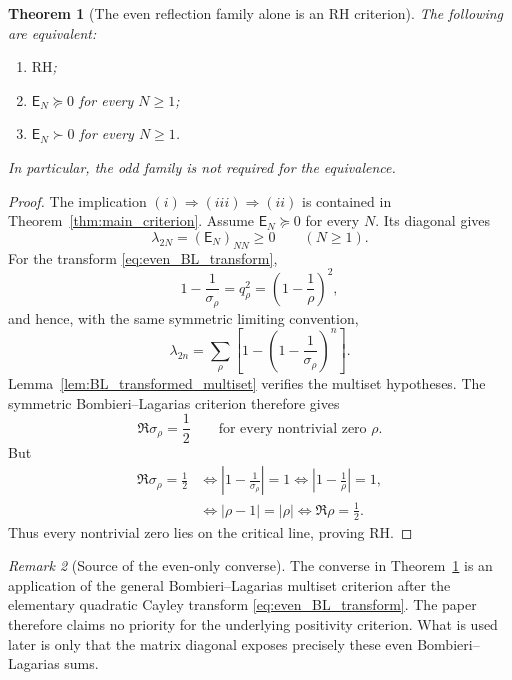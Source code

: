 \documentclass[preprint,12pt]{elsarticle}
\numberwithin{equation}{section}
\theoremstyle{plain}
\newtheorem{theorem}{Theorem}[section]
\theoremstyle{definition}
\theoremstyle{remark}
\newtheorem{remark}[theorem]{Remark}
\newcommand{\RH}{\mathrm{RH}}
\newcommand{\E}{\mathsf E}
\begin{document}
\begin{theorem}[The even reflection family alone is an RH criterion]
\label{thm:even_family_alone}
The following are equivalent:
\begin{enumerate}[label=(\roman*)]
\item \(\RH\);
\item \(\E_N\succeq0\) for every \(N\ge1\);
\item \(\E_N\succ0\) for every \(N\ge1\).
\end{enumerate}
In particular, the odd family is not required for the equivalence.
\end{theorem}

\begin{proof}
The implication \((i)\Rightarrow(iii)\Rightarrow(ii)\) is contained in
Theorem~\ref{thm:main_criterion}.  Assume \(\E_N\succeq0\) for every \(N\).  Its diagonal
gives
\[
\lambda_{2N}=(\E_N)_{NN}\ge0
\qquad(N\ge1).
\]
For the transform \eqref{eq:even_BL_transform},
\begin{equation}
1-\frac1{\sigma_\rho}
=q_\rho^2
=\left(1-\frac1\rho\right)^2,
\label{eq:even_BL_exact_identities}
\end{equation}
and hence, with the same symmetric limiting convention,
\begin{equation}
\lambda_{2n}
=\sum_\rho\left[
1-\left(1-\frac1{\sigma_\rho}\right)^n
\right].
\label{eq:even_Li_as_BL_sum}
\end{equation}
Lemma~\ref{lem:BL_transformed_multiset} verifies the multiset hypotheses.  The symmetric
Bombieri--Lagarias criterion therefore gives
\[
\Re\sigma_\rho=\frac12
\qquad\text{for every nontrivial zero }\rho.
\]
But
\[
\begin{aligned}
\Re\sigma_\rho=\frac12
&\iff \left|1-\frac1{\sigma_\rho}\right|=1
\iff \left|1-\frac1\rho\right|=1,\\
&\iff |\rho-1|=|\rho|
\iff \Re\rho=\frac12.
\end{aligned}
\]
Thus every nontrivial zero lies on the critical line, proving \(\RH\).
\end{proof}

\begin{remark}[Source of the even-only converse]
\label{rem:even_only_source}
The converse in Theorem~\ref{thm:even_family_alone} is an application of the general
Bombieri--Lagarias multiset criterion after the elementary quadratic Cayley transform
\eqref{eq:even_BL_transform}.  The paper therefore claims no priority for the underlying
positivity criterion.  What is used later is only that the matrix diagonal exposes precisely these
even Bombieri--Lagarias sums.
\end{remark}
\end{document}
